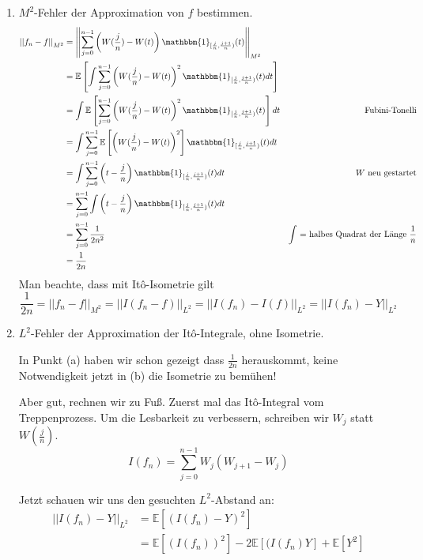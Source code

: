 \documentclass[a4paper,11pt,notitlepage,fullpage]{article}
\newcommand{\Ee}[1]{\mathbb E\left[#1\right]}
\newcommand{\indd}[1]{\mathbbm{1}_{#1}}
\newcommand{\norm}[2]{\left|\left|{#1}\right|\right|_{#2}}
\begin{document}
\begin{enumerate}
\begin{enumerate}
\item $M^2$-Fehler der Approximation von $f$ bestimmen.
\begin{align*}
\norm{f_n-f}{M^2} &= \norm{\sum_{j=0}^{n-1} \left(W(\frac{j}{n})-W(t)\right) \indd{[\frac{j}{n}, \frac{j+1}{n})}(t)}{M^2}\\
&= \Ee{\int \sum_{j=0}^{n-1} \left(W(\frac{j}{n})-W(t)\right)^2 \indd{[\frac{j}{n}, \frac{j+1}{n})}(t) dt}\\
&= \int \Ee{\sum_{j=0}^{n-1} \left(W(\frac{j}{n})-W(t)\right)^2 \indd{[\frac{j}{n}, \frac{j+1}{n})}(t) } dt &\text{Fubini-Tonelli}\\
&= \int \sum_{j=0}^{n-1} \Ee{\left(W(\frac{j}{n})-W(t)\right)^2} \indd{[\frac{j}{n}, \frac{j+1}{n})}(t)  dt\\
&= \int \sum_{j=0}^{n-1} \left(t-\frac{j}{n}\right) \indd{[\frac{j}{n}, \frac{j+1}{n})}(t)  dt & \text{$W$ neu gestartet}\\
&=  \sum_{j=0}^{n-1} \int\left(t-\frac{j}{n}\right) \indd{[\frac{j}{n}, \frac{j+1}{n})}(t)  dt \\
&=  \sum_{j=0}^{n-1} \frac{1}{2n^2} & \text{$\int$ = halbes Quadrat der Länge $\frac{1}{n}$}\\
&= \frac{1}{2n}
\end{align*}
Man beachte, dass mit Itô-Isometrie gilt
$$\frac{1}{2n} = \norm{f_n-f}{M^2} = \norm{I(f_n-f)}{L^2} = \norm{I(f_n)-I(f)}{L^2} = \norm{I(f_n)-Y}{L^2}$$

\item $L^2$-Fehler der Approximation der Itô-Integrale, ohne Isometrie.

In Punkt (a) haben wir schon gezeigt dass $\frac{1}{2n}$ herauskommt, keine Notwendigkeit jetzt in (b) die Isometrie zu bemühen!

Aber gut, rechnen wir zu Fuß. Zuerst mal das Itô-Integral vom Treppenprozess. Um die Lesbarkeit zu verbessern, schreiben wir $W_{j}$ statt $W(\frac{j}{n})$.
$$I(f_n) = \sum_{j=0}^{n-1} W_j \left( W_{j+1} - W_j\right)$$

Jetzt schauen wir uns den gesuchten $L^2$-Abstand an:
\begin{align*}
\norm{I(f_n)-Y}{L^2} &= \Ee{(I(f_n) - Y)^2}\\
&= \Ee{(I(f_n))^2} -2\Ee{(I(f_n)Y} + \Ee{Y^2}
\end{align*}


\end{enumerate}
\end{enumerate}
\end{document}
